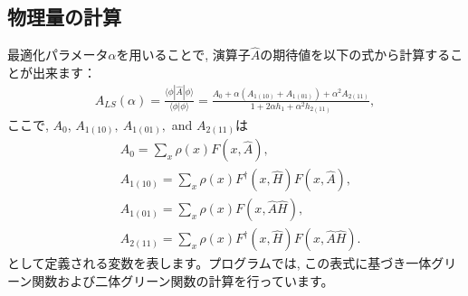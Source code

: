 \subsection{物理量の計算}
最適化パラメータ$\alpha$を用いることで, 演算子$\hat{A}$の期待値を以下の式から計算することが出来ます： 
\begin{align}
A_{LS}(\alpha) =\frac{\langle \phi| \hat{A} |\phi\rangle}{\langle \phi|\phi\rangle}=\frac{A_0 + \alpha(A_{1(10)} + A_{1(01)}) + \alpha^2 A_{2(11)}}{1 + 2\alpha h_1 + \alpha^2 h_{2(11)}},
\end{align}
ここで, $A_0$, $A_{1(10)},~A_{1(01)},$ and $A_{2(11)}$は
\begin{align}
&A_0 =\sum_{x} \rho(x) F(x,  \hat{A}),\\
&A_{1(10)}=\sum_{x} \rho(x) F^{\dag}(x,  \hat{H}) F(x, \hat{A}),\\
&A_{1(01)}=\sum_{x} \rho(x) F(x, \hat{A}\hat{H}),\\
&A_{2(11)}=\sum_{x} \rho(x) F^{\dag}(x,  \hat{H})F(x,  \hat{A}\hat{H}).
\end{align}
として定義される変数を表します。プログラムでは, この表式に基づき一体グリーン関数および二体グリーン関数の計算を行っています。
